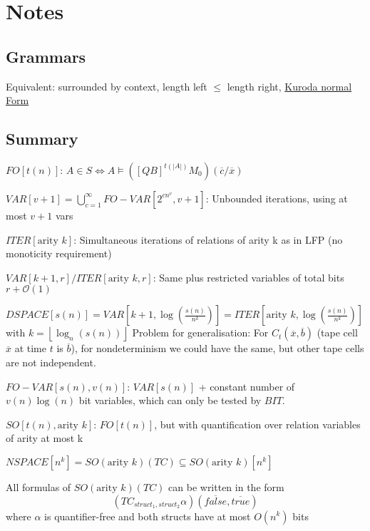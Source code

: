 \chapter{Notes}\label{ch:notes}

\section{Grammars}\label{grammars}

Equivalent: surrounded by context, length left \(\leq\) length right,
\href{https://en.wikipedia.org/wiki/Kuroda_normal_form}{Kuroda normal
Form}

\section{Summary}\label{summary}

\(FO[t(n)]\):
\(A \in S \Leftrightarrow A \models \left([QB]^{t(|A|)}M_{0}\right)(\overline{c}/\overline{x})\)

\noindent\(VAR[v + 1] = \bigcup_{c = 1}^{\infty}FO-VAR[2^{cn^{v}}, v + 1]\):
Unbounded iterations, using at most \(v + 1\) vars

\noindent\(ITER[\text{arity } k]\): Simultaneous iterations of relations of arity
k as in LFP (no monoticity requirement)

\noindent\(VAR[k + 1, r] / ITER[\text{arity } k, r]\): Same plus restricted
variables of total bits \(r + \mathcal{O}(1)\)

\noindent\(DSPACE[s(n)] = VAR\left[ k + 1, \log\left( \frac{s(n)}{n^{k}} \right) \right] = ITER[\text{arity } k, \log\left( \frac{s(n)}{n^{k}} \right)]\)
with \(k = \left\lfloor \log_{n}(s(n)) \right\rfloor\) Problem for
generalisation: For \(C_{t}(\overline{x}, \overline{b})\) (tape cell
\(\overline{x}\) at time \(t\) is \(\overline{b}\)), for nondeterminism
we could have the same, but other tape cells are not independent.

\noindent\(FO-VAR[s(n), v(n)]\): \(VAR[s(n)]\) + constant number of
\(v(n)\log(n)\) bit variables, which can only be tested by \(BIT\).

\noindent\(SO[t(n), \text{arity }k]\): \(FO[t(n)]\), but with quantification over
relation variables of arity at most k

\noindent\(NSPACE[n^{k}] = SO(\text{arity }k)(TC) \subseteq SO(\text{arity } k)[n^{k}]\)

All formulas of \(SO(\text{arity }k)(TC)\) can be written in the form \[
(TC_{struct_{1}, struct_{2}}\alpha)(\overline{false}, \overline{true})
\] where \(\alpha\) is quantifier-free and both structs have at most
\(O(n^{k})\) bits


